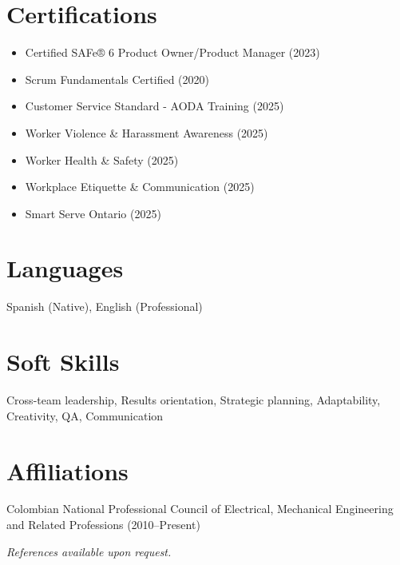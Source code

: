 \documentclass[a4paper,10pt]{article}
\begin{document}
\section*{\textcolor{myblue}{Certifications}}
\begin{itemize}
    \item Certified SAFe® 6 Product Owner/Product Manager (2023)
    \item Scrum Fundamentals Certified (2020)
	\item Customer Service Standard - AODA Training (2025)
    \item Worker Violence \& Harassment Awareness (2025)
    \item Worker Health \& Safety (2025)
    \item Workplace Etiquette \& Communication (2025)
    \item Smart Serve Ontario (2025)
\end{itemize}

\section*{\textcolor{myblue}{Languages}}
Spanish (Native), English (Professional)

\section*{\textcolor{myblue}{Soft Skills}}
Cross-team leadership, Results orientation, Strategic planning, Adaptability, Creativity, QA, Communication

\section*{\textcolor{myblue}{Affiliations}}
Colombian National Professional Council of Electrical, Mechanical Engineering and Related Professions (2010–Present)

\vfill
\begin{center}
    \textit{References available upon request.}
\end{center}
\end{document}
